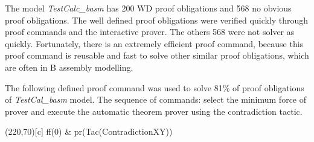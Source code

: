 \documentclass[11pt]{article} %
\begin{document}

The model \textit{TestCalc\_basm} has 200 WD proof obligations and 568 no obvious
proof obligations. The well defined proof obligations were verified quickly
through proof commands and the interactive prover. The others 568 were not solver
as quickly. Fortunately, there is an extremely efficient proof command, because
this proof command is reusable and fast to solve other similar proof
obligations, which are often in B assembly modelling.



The following defined proof command was used to solve 81\% of proof
obligations of \textit{TestCal\_basm} model. The sequence of commands: select the minimum force of prover and execute the
automatic theorem prover using the contradiction tactic.

\begin{center}
\framebox(220,70)[c]{ ff(0) \& pr(Tac(ContradictionXY)) }
\end{center}

\end{document}
